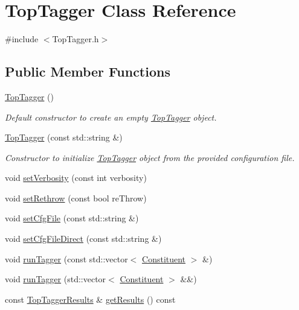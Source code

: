 \hypertarget{classTopTagger}{\section{Top\-Tagger Class Reference}
\label{classTopTagger}
}


{\ttfamily \#include $<$Top\-Tagger.\-h$>$}

\subsection*{Public Member Functions}
\begin{DoxyCompactItemize}
\item 
\hypertarget{classTopTagger_a26e4654b1eef1f7e7dcffeb02b9fc41b}{\hyperlink{classTopTagger_a26e4654b1eef1f7e7dcffeb02b9fc41b}{Top\-Tagger} ()}\label{classTopTagger_a26e4654b1eef1f7e7dcffeb02b9fc41b}

\begin{DoxyCompactList}\small\item\em Default constructor to create an empty \hyperlink{classTopTagger}{Top\-Tagger} object. \end{DoxyCompactList}\item 
\hypertarget{classTopTagger_a21d623a93398346401fb78bb09fe98b6}{\hyperlink{classTopTagger_a21d623a93398346401fb78bb09fe98b6}{Top\-Tagger} (const std\-::string \&)}\label{classTopTagger_a21d623a93398346401fb78bb09fe98b6}

\begin{DoxyCompactList}\small\item\em Constructor to initialize \hyperlink{classTopTagger}{Top\-Tagger} object from the provided configuration file. \end{DoxyCompactList}\item 
void \hyperlink{classTopTagger_ad7e22571559cb7afe0f0cf0e14d1ef41}{set\-Verbosity} (const int verbosity)
\item 
void \hyperlink{classTopTagger_ae117c09fc42674a09247fd1ad8dcb3ce}{set\-Rethrow} (const bool re\-Throw)
\item 
void \hyperlink{classTopTagger_ac18bfe0673dbd05973f45c668ed2b190}{set\-Cfg\-File} (const std\-::string \&)
\item 
void \hyperlink{classTopTagger_ae7a38be12023643495adea6f9a696ff3}{set\-Cfg\-File\-Direct} (const std\-::string \&)
\item 
void \hyperlink{classTopTagger_accf43da3b1469e524bfe6f568116219a}{run\-Tagger} (const std\-::vector$<$ \hyperlink{classConstituent}{Constituent} $>$ \&)
\item 
void \hyperlink{classTopTagger_ac4d5c2b7983a99495fa6cfa7e0287e74}{run\-Tagger} (std\-::vector$<$ \hyperlink{classConstituent}{Constituent} $>$ \&\&)
\item 
const \hyperlink{classTopTaggerResults}{Top\-Tagger\-Results} \& \hyperlink{classTopTagger_ac6f06aeb683b0b761ad09ac018e11d08}{get\-Results} () const 
\end{DoxyCompactItemize}


